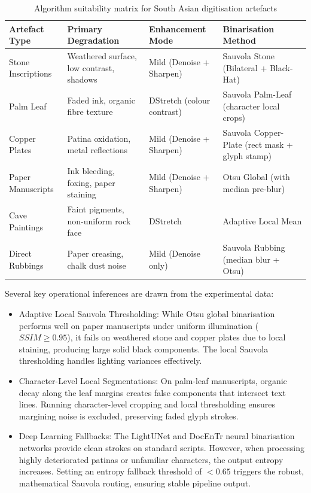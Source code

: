 \begin{table}[htbp]
\centering
\fontsize{10}{12}\selectfont
\caption{Algorithm suitability matrix for South Asian digitisation artefacts}
\label{tab:suitability_matrix}
\begin{tabular}{|p{2.5cm}|p{3.5cm}|p{3cm}|p{3.5cm}|}
	\hline
	Artefact Type & Primary Degradation & Enhancement Mode & Binarisation Method \\
	\hline
	Stone Inscriptions & Weathered surface, low contrast, shadows & Mild (Denoise + Sharpen) & Sauvola Stone (Bilateral + Black-Hat) \\ \hline
	Palm Leaf & Faded ink, organic fibre texture & DStretch (colour contrast) & Sauvola Palm-Leaf (character local crops) \\ \hline
	Copper Plates & Patina oxidation, metal reflections & Mild (Denoise + Sharpen) & Sauvola Copper-Plate (rect mask + glyph stamp) \\ \hline
	Paper Manuscripts & Ink bleeding, foxing, paper staining & Mild (Denoise + Sharpen) & Otsu Global (with median pre-blur) \\ \hline
	Cave Paintings & Faint pigments, non-uniform rock face & DStretch & Adaptive Local Mean \\ \hline
	Direct Rubbings & Paper creasing, chalk dust noise & Mild (Denoise only) & Sauvola Rubbing (median blur + Otsu) \\
	\hline
\end{tabular}
\end{table}

Several key operational inferences are drawn from the experimental data:
\begin{itemize}
	\item Adaptive Local Sauvola Thresholding: While Otsu global binarisation performs well on paper manuscripts under uniform illumination ($SSIM \ge 0.95$), it fails on weathered stone and copper plates due to local staining, producing large solid black components. The local Sauvola thresholding handles lighting variances effectively.
	
	\item Character-Level Local Segmentations: On palm-leaf manuscripts, organic decay along the leaf margins creates false components that intersect text lines. Running character-level cropping and local thresholding ensures margining noise is excluded, preserving faded glyph strokes.
	
	\item Deep Learning Fallbacks: The LightUNet and DocEnTr neural binarisation networks provide clean strokes on standard scripts. However, when processing highly deteriorated patinas or unfamiliar characters, the output entropy increases. Setting an entropy fallback threshold of $< 0.65$ triggers the robust, mathematical Sauvola routing, ensuring stable pipeline output.
\end{itemize}

